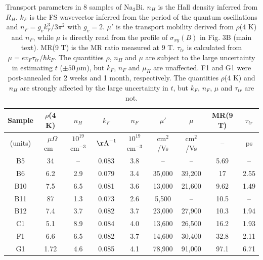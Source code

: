 \begin{table}[!htbp]
  \begin{center}
\begin{tabular}{|c|c|c|c|c|c|c|c|c|} \hline
Sample	& $\rho$(4 K)       & $n_H$	& $k_F$ &     $n_F$       &  $\mu'$    &     $\mu$  & MR(9 T)  & $\tau_{tr}$ \\ \hline
(units)   & $\;\;\mu\Omega$cm$\;\;$ & $10^{19}$ cm$^{-3}$  &  $\rm{\AA}^{-1}$    &   $10^{19}$ cm$^{-3}$      &  cm$^2$/Vs      & cm$^2$/Vs  & --  & ps \\ \hline\hline
B5		  &	34         &			  --      &	  0.083		 &  3.8      &     	--    &   --		         &    5.69   &   -- \\ \hline
B6		  &  6.2		        &   2.9		&   0.079		 &  	3.4     &		35,000    &   39,200    &  17     &   2.55 \\ \hline
B10	  &  7.5				   &  6.5				& 	0.081      &		3.6    &    13,000    &  	21,600  & 9.62   &  1.49  \\ \hline
B11	  &  87        &  1.3				&  0.073			&  	2.6 			&  5,500        &     --        &  10.5  &  --  \\ \hline
B12	  &  7.4        &  3.7				&  0.082			&  	3.7 			&  23,000        &  27,900  &    10.3 &  1.94 \\ \hline
C1			&  5.1					&  8.9				&  0.084			&   4.0			&  13,600      &   26,500    & 16.2  &  1.93  \\ \hline
F1	      &  6.6         &  6.5         &  0.082     &   3.7     &   14,600     &   30,400   &  32.8  &  2.11  \\  \hline
G1			&  1.72					&  4.6					&  0.085		&   4.1			&  78,900	   &   91,000   & 97.1   &   6.71 \\ \hline
\end{tabular}
\caption{\label{tab}
Transport parameters in 8 samples of Na$_3$Bi. $n_H$ is the Hall density inferred from $R_H$. $k_F$ is the FS wavevector inferred from the period of the quantum oscillations and $n_F = g_vk_F^3/3\pi^2$ with $g_v =2$. $\mu'$ is the transport mobility derived from $\rho$(4 K) and $n_F$, while $\mu$ is directly read from the profile of $\sigma_{xy}(B)$ in Fig. 3B (main text). MR(9 T) is the MR ratio measured at 9 T. $\tau_{tr}$ is calculated from $\mu = ev_F\tau_{tr}/\hbar k_F$. The quantities $\rho$, $n_H$ and $\mu$ are subject to the large uncertainty in estimating $t$ ($\pm 50\,\mu$m), but $k_F$, $n_F$ and $\mu_H$ are unaffected. F1 and G1 were post-annealed for 2 weeks and 1 month, respectively. The quantities $\rho$(4 K) and $n_H$ are strongly affected by the large uncertainty in $t$, but $k_F$, $n_F$, $\mu$ and $\tau_{tr}$ are not.
}
  \end{center}
\end{table}




